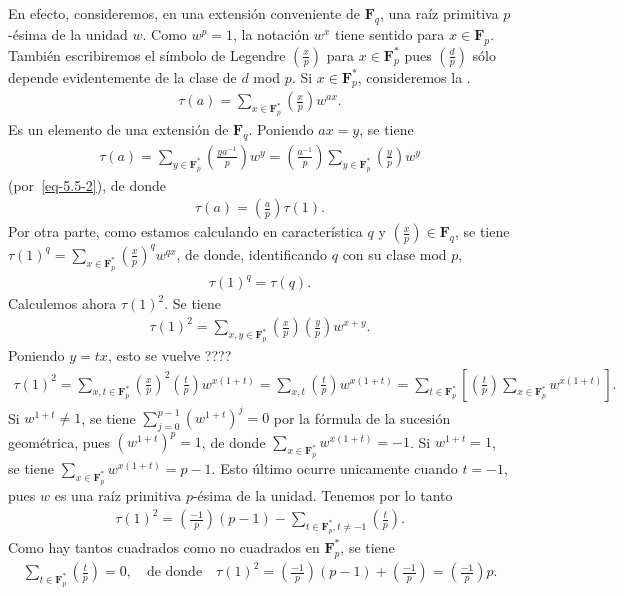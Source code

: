 \documentclass[bibtotoc,leqno,spanish]{amsbook}
\let\emph\relax %
\newcommand{\FF}{\mathbf{F}}
\newcommand{\leg}[2]{\left(\frac{#1}{#2}\right)}
\numberwithin{equation}{section}
\theoremstyle{note}
\theoremstyle{note}
\theoremstyle{rem}
\numberwithin{theorem}{section}
\numberwithin{proposition}{section}
\numberwithin{definition}{section}
\numberwithin{lemma}{section}
\numberwithin{corollary}{section}
\numberwithin{example}{section}
\numberwithin{footnote}{section}%
\begin{document}
En efecto, consideremos, en una extensi\'on conveniente de $\FF_{q}$, una ra\'iz primitiva $p$-\'esima de
la unidad $w$. Como $w^{p}=1$, la notaci\'on $w^{x}$ tiene sentido para $x\in\FF_{p}$. Tambi\'en escribiremos
el s\'imbolo de Legendre $\leg{x}{p}$ para $x\in\FF_{p}^{*}$ pues $\leg{d}{p}$ s\'olo depende evidentemente
de la clase de $d$ mod $p$. Si $x\in\FF_{p}^{*}$, consideremos la \emph{``suma de Gauss''}.
\begin{gather}
\tau(a) = \sum_{x\in\FF_{p}^{*}}\leg{x}{p}w^{ax}.
\end{gather}
Es un elemento de una extensi\'on de $\FF_{q}$. Poniendo $ax = y$, se tiene
\begin{gather*}
\tau(a) = \sum_{y\in\FF_{p}^{*}}\leg{ya^{-1}}{p}w^{y} = \leg{a^{-1}}{p}\sum_{y\in\FF_{p}^{*}}\leg{y}{p}w^{y}
\end{gather*}
(por~\eqref{eq-5.5-2}), de donde
\begin{gather}\label{eq-5.5-4}
\tau(a) = \leg{a}{p}\tau(1).
\end{gather}
Por otra parte, como estamos calculando en caracter\'istica $q$ y $\leg{x}{p}\in\FF_{q}$, se tiene
$\tau(1)^{q}=\sum_{x\in\FF_{p}^{*}}\leg{x}{p}^{q}w^{qx}$, de donde, identificando $q$ con su clase mod $p$,
\begin{gather}\label{eq-5.5-5}
\tau(1)^{q}=\tau(q).
\end{gather}
Calculemos ahora $\tau(1)^{2}$. Se tiene
\begin{gather*}
\tau(1)^{2} = \sum_{x,y\in\FF_{p}^{*}}\leg{x}{p}\leg{y}{p}w^{x+y}.
\end{gather*}
Poniendo $y=tx$, esto se vuelve ????
\begin{gather*}
\tau(1)^{2}=\sum_{x,t\in\FF_{p}^{*}}\leg{x}{p}^{2}\leg{t}{p}w^{x(1+t)}=\sum_{x,t}\leg{t}{p}w^{x(1+t)}
=\sum_{t\in\FF_{p}^{*}}\left[\leg{t}{p}\sum_{x\in\FF_{p}^{*}}w^{x(1+t)}\right].
\end{gather*}
Si $w^{1+t}\neq 1$, se tiene $\sum_{j=0}^{p-1}(w^{1+t})^{j}=0$ por la f\'ormula de la sucesi\'on geom\'etrica,
pues $(w^{1+t})^{p}=1$, de donde $\sum_{x\in\FF_{p}^{*}}w^{x(1+t)}=-1$. Si $w^{1+t}=1$, se tiene
$\sum_{x\in\FF_{p}^{*}}w^{x(1+t)}=p-1$. Esto \'ultimo ocurre unicamente cuando $t=-1$, pues
$w$ es una ra\'iz primitiva $p$-\'esima de la unidad. Tenemos por lo tanto
\begin{gather*}
\tau(1)^{2}=\leg{-1}{p}(p-1)-\sum_{t\in\FF_{p}^{*}, t\neq -1}\leg{t}{p}.
\end{gather*}
Como hay tantos cuadrados como no cuadrados en $\FF_{p}^{*}$, se tiene
\begin{gather*}
\sum_{t\in\FF_{p}^{*}}\leg{t}{p}=0,\quad\text{de donde}\quad\tau(1)^{2}=\leg{-1}{p}(p-1)+\leg{-1}{p}=\leg{-1}{p}p.
\end{gather*}
\end{document}
